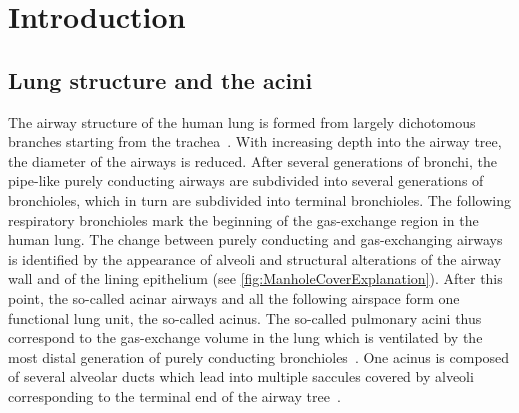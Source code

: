 \documentclass[a4paper,DIV=calc,abstract,english]{scrartcl}
\newcommand{\meantotalnumberofaciniVariant}{5470}
\newcommand{\meanacinarvolume}{1.148} %
\newcommand{\meannumberofalveoli}{8470} %
\newcommand{\meanacinarsurface}{73.9} %
\begin{document}
\begin{abstract}
The small trees of gas-exchanging pulmonary airways which are fed by the most distal purely conducting airways are called acini and represent the functional gas-exchanging units.
The three-dimensional architecture of the acini has a strong influence on ventilation and particle deposition.
Due to the difficulty to identify individual acini in lung sections the knowledge about the number of acini and their biological parameters like volume, surface area, and number of alveoli per acinus are limited.
We developed a method to extracted individual acini from lungs imaged by high-resolution synchrotron radiation based X-ray tomographic microscopy and estimated their volume, surface area and number of alveoli.
Rat acini were isolated by semi-automatically closing the airways at the transition from conducting to gas-exchanging airways.
We estimated a mean acinar volume of \SI{\meanacinarvolume}{\milli\meter\cubed}, a mean acinar surface area of \SI{\meanacinarsurface}{\milli\meter\squared}, and a mean of \meannumberofalveoli\xspace alveoli per acinus.
Assuming that the acini are similarly sized throughout different regions of the lung, we calculated that a rat lung contains roughly \meantotalnumberofaciniVariant\xspace acini.
We conclude that our novel approach is well suited for the fast and reliable characterization of a large number of individual acini in healthy, diseased, or transgenic lungs of different species including humans.
\end{abstract}

\ifJCS
\else
	\twocolumn
\fi

\section{Introduction}
\subsection{Lung structure and the acini}
The airway structure of the human lung is formed from largely dichotomous branches starting from the trachea~\cite{Weibel1991}.
With increasing depth into the airway tree, the diameter of the airways is reduced.
After several generations of bronchi, the pipe-like purely conducting airways are subdivided into several generations of bronchioles, which in turn are subdivided into terminal bronchioles.
The following respiratory bronchioles mark the beginning of the gas-exchange region in the human lung.
The change between purely conducting and gas-exchanging airways is identified by the appearance of alveoli and structural alterations of the airway wall and of the lining epithelium (see \autoref{fig:ManholeCoverExplanation}).
After this point, the so-called acinar airways and all the following airspace form one functional lung unit, the so-called acinus.
The so-called pulmonary acini thus correspond to the gas-exchange volume in the lung which is ventilated by the most distal generation of purely conducting bronchioles~\cite{Rodriguez1987}.
One acinus is composed of several alveolar ducts which lead into multiple saccules covered by alveoli corresponding to the terminal end of the airway tree~\cite{Schittny2007a}.
\end{document}
